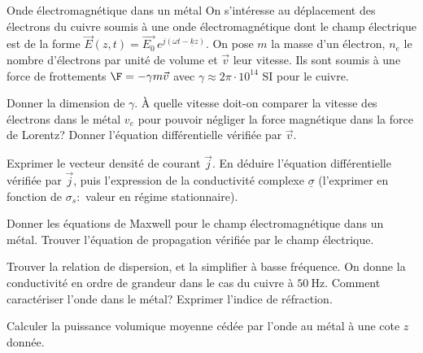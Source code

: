 \begin{exo}[PC][1][colle]{Onde électromagnétique dans un métal}
  On s'intéresse au déplacement des électrons du cuivre soumis à une onde électromagnétique dont le champ électrique est de la forme $\Vec{E}(z, t)=\Vec{E_0}\, e^{j(\omega t-\underline{k} z)}$. On pose $m$ la masse d'un électron, $n_e$ le nombre d'électrons par unité de volume et $\vec{v}$ leur vitesse. Ils sont soumis à une force de frottements $\F=-\gamma m \vec{v}$ avec $\gamma \approx 2 \pi \cdot 10^{14}$ SI pour le cuivre.
  \begin{quest}
    \item   Donner la dimension de $\gamma$. À quelle vitesse doit-on comparer la vitesse des électrons dans le métal $v_e$ pour pouvoir négliger la force magnétique dans la force de Lorentz? Donner l'équation différentielle vérifiée par $\vec{v}$.
\item Exprimer le vecteur densité de courant $\vec{j}$. En déduire l'équation différentielle vérifiée par $\vec{j}$, puis l'expression de la conductivité complexe $\underline{\sigma}$ (l'exprimer en fonction de $\sigma_s:$ valeur en régime stationnaire).
\item Donner les équations de Maxwell pour le champ électromagnétique dans un métal. Trouver l'équation de propagation vérifiée par le champ électrique.
\item Trouver la relation de dispersion, et la simplifier à basse fréquence. On donne la conductivité en ordre de grandeur dans le cas du cuivre à $50 \mathrm{~Hz}$. Comment caractériser l'onde dans le métal? Exprimer l'indice de réfraction.
\item Calculer la puissance volumique moyenne cédée par l'onde au métal à une cote $z$ donnée.
  \end{quest}
\end{exo}

